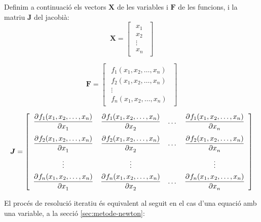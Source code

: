 Definim a continuació els vectors $\boldsymbol{X}$ de les variables i $\boldsymbol{F}$ de les funcions, i la matriu  $\boldsymbol{J}$ del jacobià:
\begin{equation}
	\boldsymbol{X} =  
	\begin{bmatrix}\begin{array}{c} 
			x_1 \\
			x_2 \\
			\vdots{} \\
			x_n
	\end{array}\end{bmatrix}
\end{equation}

\begin{equation}
	\boldsymbol{F} =  
	\begin{bmatrix}\begin{array}{c} 
			f_1(x_1, x_2, \dots, x_n) \\[1ex]
			f_2(x_1, x_2, \dots, x_n) \\
			\vdots{} \\
			f_n(x_1, x_2, \dots, x_n)
	\end{array}\end{bmatrix}
\end{equation}

\begin{equation}
	\boldsymbol{J} =  
	\begin{bmatrix}\begin{array}{cccc} 
			\displaystyle
			\frac{\partial^{}f_1(x_1, x_2, \dots, x_n)}{\partial x_1^{}} & 
			\displaystyle
			\frac{\partial^{}f_1(x_1, x_2, \dots, x_n)}{\partial x_2^{}} & 
			\dots{} &
			\displaystyle
			\frac{\partial^{}f_1(x_1, x_2, \dots, x_n)}{\partial x_n^{}} \\[3ex]
			\displaystyle
			\frac{\partial^{}f_2(x_1, x_2, \dots, x_n)}{\partial x_1^{}} & 
			\displaystyle
			\frac{\partial^{}f_2(x_1, x_2, \dots, x_n)}{\partial x_2^{}} & 
			\dots{} &
			\displaystyle
			\frac{\partial^{}f_2(x_1, x_2, \dots, x_n)}{\partial x_n^{}} \\[3ex]
			\vdots{} & \vdots{} & {} & \vdots{} \\[1ex]
			\displaystyle
			\frac{\partial^{}f_n(x_1, x_2, \dots, x_n)}{\partial x_1^{}} & 
			\displaystyle
			\frac{\partial^{}f_n(x_1, x_2, \dots, x_n)}{\partial x_2^{}} & 
			\dots{} &
			\displaystyle
			\frac{\partial^{}f_n(x_1, x_2, \dots, x_n)}{\partial x_n^{}}
	\end{array}\end{bmatrix}
\end{equation}


El procés de resolució iteratiu és equivalent al seguit en el cas d'una  equació amb una variable, a la secció \vref{sec:metode-newton}:


